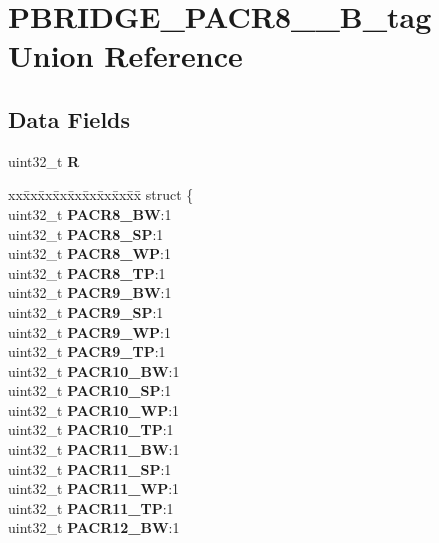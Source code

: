\hypertarget{unionPBRIDGE__PACR8__15__32B__tag}{}\section{P\+B\+R\+I\+D\+G\+E\+\_\+\+P\+A\+C\+R8\+\_\+\_\+B\+\_\+tag Union Reference}
\label{unionPBRIDGE__PACR8__15__32B__tag}
\subsection*{Data Fields}
\begin{DoxyCompactItemize}
\item 
\mbox{\label{unionPBRIDGE__PACR8__15__32B__tag_a2c014c15253521a1c2daf10a89e0399c}} 
uint32\+\_\+t {\bfseries R}
\item 
\mbox{\label{unionPBRIDGE__PACR8__15__32B__tag_a7e88db9b3074221089490f2c8de0de33}} 
\begin{tabbing}
xx\=xx\=xx\=xx\=xx\=xx\=xx\=xx\=xx\=\kill
struct \{\\
\>uint32\_t {\bfseries PACR8\_BW}:1\\
\>uint32\_t {\bfseries PACR8\_SP}:1\\
\>uint32\_t {\bfseries PACR8\_WP}:1\\
\>uint32\_t {\bfseries PACR8\_TP}:1\\
\>uint32\_t {\bfseries PACR9\_BW}:1\\
\>uint32\_t {\bfseries PACR9\_SP}:1\\
\>uint32\_t {\bfseries PACR9\_WP}:1\\
\>uint32\_t {\bfseries PACR9\_TP}:1\\
\>uint32\_t {\bfseries PACR10\_BW}:1\\
\>uint32\_t {\bfseries PACR10\_SP}:1\\
\>uint32\_t {\bfseries PACR10\_WP}:1\\
\>uint32\_t {\bfseries PACR10\_TP}:1\\
\>uint32\_t {\bfseries PACR11\_BW}:1\\
\>uint32\_t {\bfseries PACR11\_SP}:1\\
\>uint32\_t {\bfseries PACR11\_WP}:1\\
\>uint32\_t {\bfseries PACR11\_TP}:1\\
\>uint32\_t {\bfseries PACR12\_BW}:1\\

\end{tabbing}
\end{DoxyCompactItemize}
